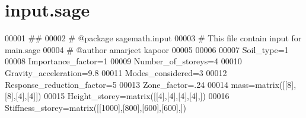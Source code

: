 \hypertarget{input_8sage_source}{}\section{input.\+sage}
\label{input_8sage_source}

\begin{DoxyCode}
00001 ##
00002 # @package sagemath.input
00003 # This file contain input for main.sage
00004 # @author amarjeet kapoor
00005 
00006 
00007 Soil\_type=1
00008 Importance\_factor=1
00009 Number\_of\_storeys=4
00010 Gravity\_acceleration=9.8
00011 Modes\_considered=3
00012 Response\_reduction\_factor=5
00013 Zone\_factor=.24
00014 mass=matrix([[8],[8],[4],[4]])
00015 Height\_storey=matrix([[4],[4],[4],[4],])
00016 Stiffness\_storey=matrix([[1000],[800],[600],[600],])
\end{DoxyCode}
